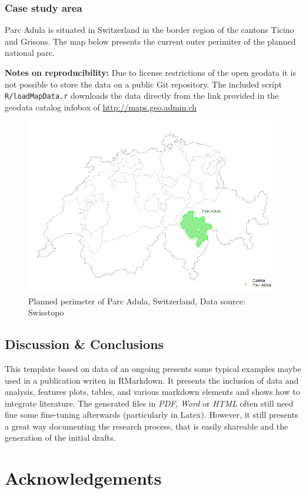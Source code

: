 \documentclass[]{article}
\begin{document}
\subsubsection{Case study area}\label{case-study-area}

Parc Adula is situated in Switzerland in the border region of the
cantons Ticino and Grisons. The map below presents the current outer
perimiter of the planned national parc.

\textbf{Notes on reproducibility:} Due to license restrictions of the
open geodata it is not possible to store the data on a public Git
repository. The included script \texttt{R/loadMapData.r} downloads the
data directly from the link provided in the geodata catalog infobox of
\url{http://maps.geo.admin.ch}

\begin{figure}
\includegraphics[width=0.6\linewidth]{figures/map} \caption{Planned perimeter of Parc Adula, Switzerland, Data source: Swisstopo}\label{fig:map}
\end{figure}

\subsection{Discussion \& Conclusions}\label{discussion-conclusions}

This template based on data of an ongoing presents some typical examples
maybe used in a publication writen in RMarkdown. It presents the
inclusion of data and analysis, features plots, tables, and various
markdown elements and shows how to integrate literature. The generated
files in \emph{PDF}, \emph{Word} or \emph{HTML} often still need fine
some fine-tuning afterwards (particularly in Latex). However, it still
presents a great way documenting the research process, that is easily
shareable and the generation of the initial drafts.

\section{Acknowledgements}\label{acknowledgements}
\end{document}
